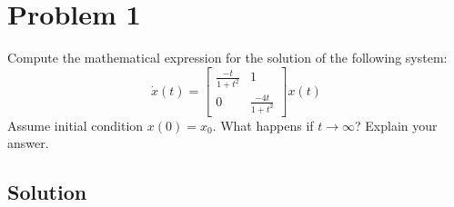 \section*{Problem 1}

Compute the mathematical expression for the solution of the following system:
\begin{equation*}
    \dot x(t)
    =
    \begin{bmatrix}
        \frac{-t}{1+t^2} & 1                 \\
        0                & \frac{-4t}{1+t^2}
    \end{bmatrix}
    x(t)
\end{equation*}
Assume initial condition \( x(0) = x_0 \).
What happens if \( t \rightarrow \infty \)?
Explain your answer.

\subsection*{Solution}

